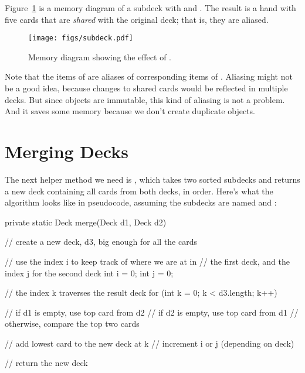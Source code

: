 
Figure~\ref{fig.subdeck} is a memory diagram of a subdeck with  and .
The result is a hand with five cards that are {\em shared} with the original deck; that is, they are aliased.

\begin{figure}[!ht]
\begin{center}
\texttt{[image: figs/subdeck.pdf]}
\caption{Memory diagram showing the effect of .}
\label{fig.subdeck}
\end{center}
\end{figure}


Note that the items of  are aliases of corresponding items of . Aliasing might not be a good idea, because changes to shared cards would be reflected in multiple decks.
But since  objects are immutable, this kind of aliasing is not a problem.
And it saves some memory because we don't create duplicate  objects.


\section{Merging Decks}


The next helper method we need is , which takes two sorted subdecks and returns a new deck containing all cards from both decks, in order.
Here's what the algorithm looks like in pseudocode, assuming the subdecks are named  and :

\begin{code}
private static Deck merge(Deck d1, Deck d2) {
    // create a new deck, d3, big enough for all the cards

    // use the index i to keep track of where we are at in
    // the first deck, and the index j for the second deck
    int i = 0;
    int j = 0;

    // the index k traverses the result deck
    for (int k = 0; k < d3.length; k++) {
        // if d1 is empty, use top card from d2
        // if d2 is empty, use top card from d1
        // otherwise, compare the top two cards

        // add lowest card to the new deck at k
        // increment i or j (depending on deck)
    }
    // return the new deck
}
\end{code}

